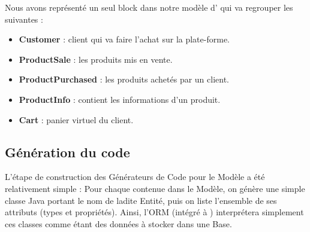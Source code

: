 Nous avons représenté un seul block dans notre modèle d'\kwentity{} qui va regrouper les \kwentity{} suivantes :  

\begin{itemize}
  \item[\textbullet] \textbf{Customer} : client qui va faire l'achat sur la plate-forme.
  \item[\textbullet] \textbf{ProductSale} : les produits mis en vente.
  \item[\textbullet] \textbf{ProductPurchased} : les produits achetés par un client.
  \item[\textbullet] \textbf{ProductInfo} : contient les informations d'un produit.
  \item[\textbullet] \textbf{Cart} : panier virtuel du client.
\end{itemize}

\subsection{Génération du code \kwentity{}}

L'étape de construction des Générateurs de Code pour le Modèle \kwentity{} a été relativement simple : Pour chaque \kwentity{} contenue dans le Modèle, on génère une simple classe Java portant le nom de ladite Entité, puis on liste l'ensemble de ses attributs (types et propriétés). Ainsi, l'ORM \kwebean{} (intégré à \kwplay{}) interprétera simplement ces classes comme étant des données à stocker dans une Base.





